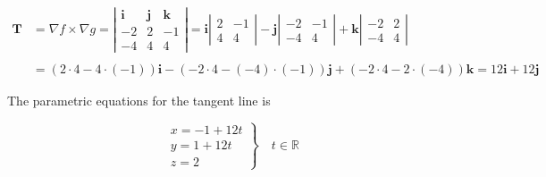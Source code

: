 \documentclass{article}
\begin{document}
\begin{align*}\mathbf{T}&=\nabla f\times\nabla g=\left|\begin{array}{ccc}
\mathbf{i}&\mathbf{j}&\mathbf{k}\\
-2&2&-1\\
-4&4&4
\end{array}\right|=\mathbf{i}\left|\begin{array}{cc}
2&-1\\4&4
\end{array}\right|-\mathbf{j}\left|\begin{array}{cc}
-2&-1\\-4&4
\end{array}\right|+\mathbf{k}\left|\begin{array}{cc}
-2&2\\-4&4
\end{array}\right|\\\\&=(2\cdot4-4\cdot(-1))\mathbf{i}-(-2\cdot4-(-4)\cdot(-1))\mathbf{j}+(-2\cdot4-2\cdot(-4))\mathbf{k}=12\mathbf i+12\mathbf j\end{align*}

\hfill

\noindent The parametric equations for the tangent line is

\[\boxed{\left.\begin{array}{l}
x=-1+12t\\
y=1+12t\\
z=2
\end{array}\right\}\quad t\in\mathbb{R}}\]
\end{document}
